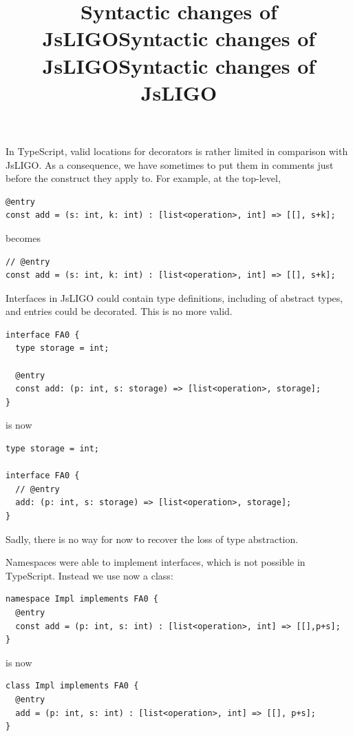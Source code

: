 \documentclass[wide]{slides}
\newcommand{\JsLIGO}[0]{\textsf{JsLIGO}}
\newcommand{\TypeScript}[0]{\textsf{TypeScript}}
\begin{document}
\begin{slide}
  \title{Syntactic changes of JsLIGO}

  In \TypeScript{}, valid locations for decorators is rather limited
  in comparison with \JsLIGO{}. As a consequence, we have sometimes to
  put them in comments just before the construct they apply to. For
  example, at the top\hyp{}level,
  \begin{lstlisting}
@entry
const add = (s: int, k: int) : [list<operation>, int] => [[], s+k];
  \end{lstlisting}
  becomes
  \begin{lstlisting}
// @entry
const add = (s: int, k: int) : [list<operation>, int] => [[], s+k];
  \end{lstlisting}

\end{slide}

\begin{slide}
  \title{Syntactic changes of JsLIGO}

  Interfaces in \JsLIGO{} could contain type definitions, including of
  abstract types, and entries could be decorated. This is no more
  valid.
  \begin{lstlisting}
interface FA0 {
  type storage = int;

  @entry
  const add: (p: int, s: storage) => [list<operation>, storage];
}
  \end{lstlisting}
  is now
  \begin{lstlisting}
type storage = int;

interface FA0 {
  // @entry
  add: (p: int, s: storage) => [list<operation>, storage];
}
  \end{lstlisting}

  Sadly, there is no way for now to recover the loss of type abstraction.

\end{slide}

\begin{slide}
  \title{Syntactic changes of JsLIGO}

  Namespaces were able to implement interfaces, which is not possible
  in \TypeScript{}. Instead we use now a class:
  \begin{lstlisting}
namespace Impl implements FA0 {
  @entry
  const add = (p: int, s: int) : [list<operation>, int] => [[],p+s];
}
  \end{lstlisting}
  is now
  \begin{lstlisting}
class Impl implements FA0 {
  @entry
  add = (p: int, s: int) : [list<operation>, int] => [[], p+s];
}
  \end{lstlisting}

\end{slide}
\end{document}
